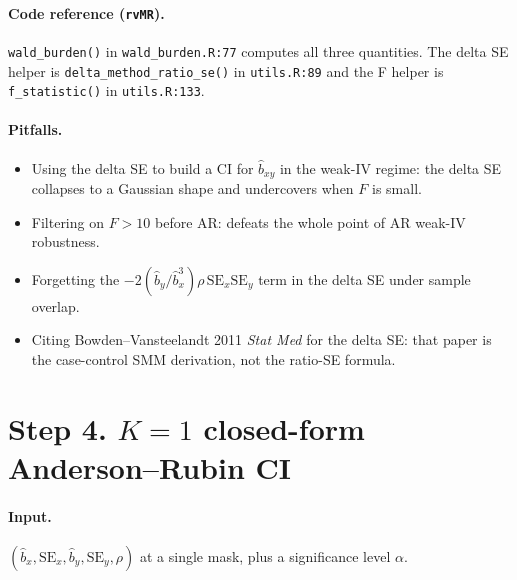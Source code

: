 \documentclass[11pt]{article}
\begin{document}
\paragraph{Code reference (\texttt{rvMR}).} \verb|wald_burden()| in \verb|wald_burden.R:77| computes all three quantities. The delta SE helper is \verb|delta_method_ratio_se()| in \verb|utils.R:89| and the F helper is \verb|f_statistic()| in \verb|utils.R:133|.

\paragraph{Pitfalls.}
\begin{itemize}
\item Using the delta SE to build a CI for $\hat b_{xy}$ in the weak-IV regime: the delta SE collapses to a Gaussian shape and undercovers when $F$ is small.
\item Filtering on $F>10$ before AR: defeats the whole point of AR weak-IV robustness.
\item Forgetting the $-2(\hat b_y/\hat b_x^3)\rho\,\mathrm{SE}_x\mathrm{SE}_y$ term in the delta SE under sample overlap.
\item Citing Bowden--Vansteelandt 2011 \emph{Stat Med} for the delta SE: that paper is the case-control SMM derivation, not the ratio-SE formula.
\end{itemize}

\section*{Step 4. $K=1$ closed-form Anderson--Rubin CI}

\paragraph{Input.} $(\hat b_x, \mathrm{SE}_x, \hat b_y, \mathrm{SE}_y, \rho)$ at a single mask, plus a significance level $\alpha$.
\end{document}
